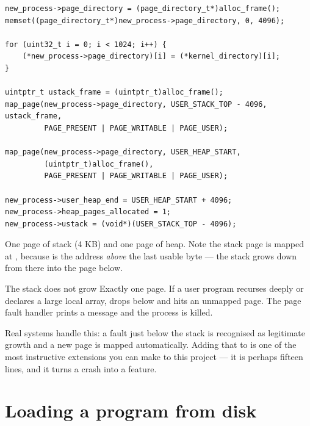 \begin{lstlisting}[style=c]
new_process->page_directory = (page_directory_t*)alloc_frame();
memset((page_directory_t*)new_process->page_directory, 0, 4096);

for (uint32_t i = 0; i < 1024; i++) {
    (*new_process->page_directory)[i] = (*kernel_directory)[i];
}

uintptr_t ustack_frame = (uintptr_t)alloc_frame();
map_page(new_process->page_directory, USER_STACK_TOP - 4096, ustack_frame,
         PAGE_PRESENT | PAGE_WRITABLE | PAGE_USER);

map_page(new_process->page_directory, USER_HEAP_START,
         (uintptr_t)alloc_frame(),
         PAGE_PRESENT | PAGE_WRITABLE | PAGE_USER);

new_process->user_heap_end = USER_HEAP_START + 4096;
new_process->heap_pages_allocated = 1;
new_process->ustack = (void*)(USER_STACK_TOP - 4096);
\end{lstlisting}

One page of stack (4 KB) and one page of heap. Note the stack page is mapped at
, because  is the address \emph{above} the last
usable byte --- the stack grows down from there into the page below.

\begin{danger}{The stack does not grow}
Exactly one page. If a user program recurses deeply or declares a large local array, 
drops below  and hits an unmapped page. The page fault handler prints a message and
the process is killed.

Real systems handle this: a fault just below the stack is recognised as legitimate growth and a new
page is mapped automatically. Adding that to  is one of the most
instructive extensions you can make to this project --- it is perhaps fifteen lines, and it turns a
crash into a feature.
\end{danger}

\section{Loading a program from disk}

